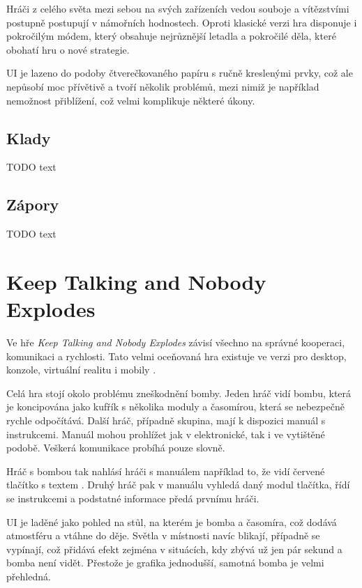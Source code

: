 Hráči z celého světa mezi sebou na svých zařízeních vedou souboje a vítězstvími
postupně postupují v námořních hodnostech.
Oproti klasické verzi hra disponuje i pokročilým módem,
který obsahuje nejrůznější letadla a pokročilé děla,
které obohatí hru o nové strategie.

UI je lazeno do podoby čtverečkovaného papíru s ručně kreslenými prvky,
což ale nepůsobí moc přívětivě a tvoří několik problémů,
mezi nimiž je například nemožnost přiblížení,
což velmi komplikuje některé úkony.


\subsection{Klady}

TODO text

\subsection{Zápory}

TODO text

\section{Keep Talking and Nobody Explodes}

Ve hře \emph{Keep Talking and Nobody Explodes} závisí všechno na správné
kooperaci, komunikaci a rychlosti.
Tato velmi oceňovaná hra existuje ve verzi pro desktop, konzole,
virtuální realitu i mobily \cite{steelcrategamesinc_keep}.

Celá hra stojí okolo problému zneškodnění bomby.
Jeden hráč vidí bombu, která je koncipována jako kufřík s několika moduly
a časomírou, která se nebezpečně rychle odpočítává.
Další hráč, případně skupina, mají k dispozici manuál s instrukcemi.
Manuál mohou prohlížet jak v elektronické, tak i ve vytištěné podobě.
Veškerá komunikace probíhá pouze slovně.

Hráč s bombou tak nahlásí hráči s manuálem například to,
že vidí červené tlačítko s textem .
Druhý hráč pak v manuálu vyhledá daný modul tlačítka, řídí se instrukcemi a
podstatné informace předá prvnímu hráči.

UI je laděné jako pohled na stůl, na kterém je bomba a časomíra,
což dodává atmostféru a vtáhne do děje.
Světla v místnosti navíc blikají, případně se vypínají,
což přidává efekt zejména v situácích, kdy zbývá už jen pár sekund a bomba není
vidět.
Přestože je grafika jednodušší, samotná bomba je velmi přehledná.

